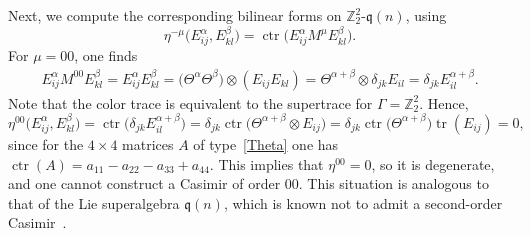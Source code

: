 \documentclass[pdftex]{sigma}
\numberwithin{equation}{section}
\theoremstyle{definition}
\def\Z2{\mathbb{Z}_2^2}
\def\qq{$\Z2$-$\q(n)$}
\def\q{\mathfrak{q}}
\begin{document}
Next, we compute the corresponding bilinear forms on \qq, using
\begin{equation*}
	\eta^{-\mu} \bigl(E_{ij}^\alpha, E_{kl}^\beta\bigr)=\operatorname{ctr}\bigl(E_{ij}^\alpha M^\mu E_{kl}^\beta\bigr).
\end{equation*}
For $\mu=00$, one finds
\begin{align*}
	E_{ij}^\alpha M^{00} E_{kl}^\beta =
	E_{ij}^\alpha E_{kl}^\beta=
	\bigl(\Theta^\alpha \Theta^\beta\bigr) \otimes (E_{ij}E_{kl}) =
	  \Theta^{\alpha+\beta} \otimes \delta_{jk}E_{il} = \delta_{jk} E_{il}^{\alpha+\beta}.
\end{align*}
Note that the color trace is equivalent to the supertrace for $\Gamma = \Z2.$
Hence,
\begin{equation*}
	\eta^{00} \bigl(E_{ij}^\alpha, E_{kl}^\beta\bigr)=\operatorname{ctr}\bigl(\delta_{jk} E_{il}^{\alpha+\beta}\bigr) =
	\delta_{jk} \operatorname{ctr}\bigl( \Theta^{\alpha+\beta} \otimes E_{ij} \bigr)= \delta_{jk} \operatorname{ctr}\bigl(\Theta^{\alpha+\beta}\bigr)\operatorname{tr}(E_{ij}) = 0,
\end{equation*}
since for the $4\times 4$ matrices $A$ of type~\eqref{Theta} one has $\operatorname{ctr}(A)=a_{11}-a_{22}-a_{33}+a_{44}$.
This implies that $\eta^{00}=0$, so it is degenerate, and one cannot construct a Casimir of order $00$.
This situation is analogous to that of the Lie superalgebra $\q(n)$, which is known not to admit a second-order Casimir~\cite{Sergeev1983}.
\end{document}
